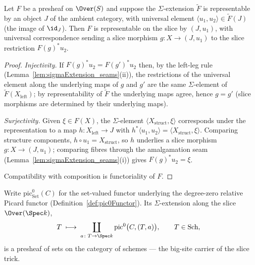 \begin{theorem}
  \label{thm:representableBy_overSlice}
  \leanok
  Let \(F\) be a presheaf on \(\Over(S)\) and suppose the \(\Sigma\)-extension
  \(\widetilde F\) is representable by an object \(J\) of the ambient category, with
  universal element \(\langle u_1, u_2 \rangle \in \widetilde F(J)\) (the image of
  \(\id_J\)). Then \(F\) is representable on the slice by \((J, u_1)\), with universal
  correspondence sending a slice morphism \(g \colon X \to (J,u_1)\) to the slice
  restriction \(F(g)^{*} u_2\).
\end{theorem}
\begin{proof}
  \leanok
  \emph{Injectivity.} If \(F(g)^{*}u_2 = F(g')^{*}u_2\) then, by the left-leg rule
  (Lemma~\ref{lem:sigmaExtension_seams}(ii)), the restrictions of the universal element
  along the underlying maps of \(g\) and \(g'\) are the same \(\Sigma\)-element of
  \(\widetilde F(X_{\mathrm{left}})\); by representability of \(\widetilde F\) the
  underlying maps agree, hence \(g = g'\) (slice morphisms are determined by their
  underlying maps).

  \emph{Surjectivity.} Given \(\xi \in F(X)\), the \(\Sigma\)-element
  \(\langle X_{\mathrm{struct}}, \xi\rangle\) corresponds under the representation to a map
  \(h \colon X_{\mathrm{left}} \to J\) with
  \(h^{*}\langle u_1, u_2\rangle = \langle X_{\mathrm{struct}}, \xi\rangle\). Comparing
  structure components, \(h \circ u_1 = X_{\mathrm{struct}}\), so \(h\) underlies a slice
  morphism \(g \colon X \to (J, u_1)\); comparing fibres through the amalgamation seam
  (Lemma~\ref{lem:sigmaExtension_seams}(i)) gives \(F(g)^{*}u_2 = \xi\).

  Compatibility with composition is functoriality of \(F\).
\end{proof}

\begin{definition}
  \label{def:pic0SigmaFunctor}
  \leanok
  Write \(\mathrm{pic}^0_{\mathrm{Set}}(C)\) for the set-valued functor underlying the
  degree-zero relative Picard functor (Definition~\ref{def:pic0Functor}). Its
  \(\Sigma\)-extension along the slice \(\Over(\Spec k)\),
  \[
    T \;\longmapsto\; \coprod_{a \colon T \to \Spec k} \mathrm{pic}^0\bigl(C, (T,a)\bigr),
    \qquad T \in \mathrm{Sch},
  \]
  is a presheaf of sets on the category of schemes — the big-site carrier of the slice
  trick.
\end{definition}

